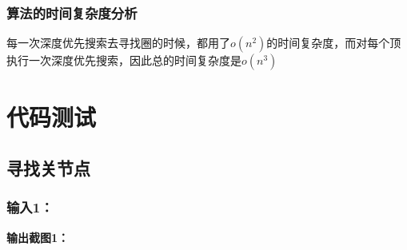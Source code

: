 \documentclass[UTF8]{article}
\begin{document}
	\subsubsection{算法的时间复杂度分析}\par
	每一次深度优先搜索去寻找圈的时候，都用了$o(n^{2})$的时间复杂度，而对每个顶执行一次深度优先搜索，因此总的时间复杂度是$o(n^{3})$\par
	
	
	
	\section{代码测试}
	\subsection{寻找关节点}
	\subsubsection{输入1：}\par
	\par
	\textbf{输出截图1：}\par
\end{document}
